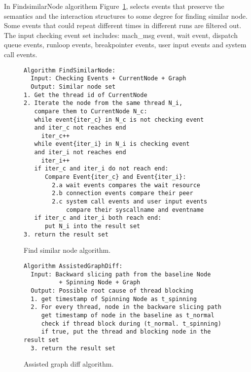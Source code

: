 In FindsimilarNode algorithem Figure~\ref{fig:alg-findsimilarnode}, \xxx selects
events that preserve the semantics and the interaction structures to some
degree for finding similar node. Some events that could repeat different times
in different runs are filtered out. The input checking event set includes:
mach\_msg event, wait event, dispatch queue events, runloop events, breakpointer
events, user input events and system call events.

\begin{figure}[H]
\footnotesize\begin{verbatim}
Algorithm FindSimilarNode:
  Input: Checking Events + CurrentNode + Graph
  Output: Similar node set
1. Get the thread id of CurrentNode
2. Iterate the node from the same thread N_i, 
   compare them to CurrentNode N_c:
   while event{iter_c} in N_c is not checking event
   and iter_c not reaches end
   	 iter_c++
   while event{iter_i} in N_i is checking event
   and iter_i not reaches end
     iter_i++
   if iter_c and iter_i do not reach end:
      Compare Event{iter_c} and Event{iter_i}:
        2.a wait events compares the wait resource
        2.b connection events compare their peer
        2.c system call events and user input events
            compare their syscallname and eventname
   if iter_c and iter_i both reach end:
      put N_i into the result set
3. return the result set
\end{verbatim}
    \caption{\xxx Find similar node algorithm.}
    \label{fig:alg-findsimilarnode}
\end{figure}

\begin{figure}[H]
\footnotesize\begin{verbatim}
Algorithm AssistedGraphDiff:
  Input: Backward slicing path from the baseline Node
          + Spinning Node + Graph
  Output: Possible root cause of thread blocking
  1. get timestamp of Spinning Node as t_spinning
  2. For every thread, node in the backware slicing path
     get timestamp of node in the baseline as t_normal
     check if thread block during (t_normal. t_spinning)
     if true, put the thread and blocking node in the result set
  3. return the result set
\end{verbatim}
    \caption{\xxx Assisted graph diff algorithm.}
    \label{fig:alg-graphdiff}
\end{figure}
